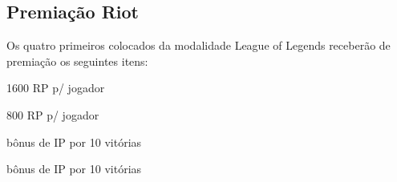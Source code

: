\subsection{Premiação Riot}

Os quatro primeiros colocados da modalidade League of Legends receberão de premiação os seguintes itens:

\begin{description}[leftmargin=!,labelwidth=\widthof{\bfseries 1º colocado},labelindent=1.5em]
	\item[1º colocado] 1600 RP p/ jogador
	\item[2º colocado] 800 RP p/ jogador
	\item[3º colocado] bônus de IP por 10 vitórias
	\item[4º colocado] bônus de IP por 10 vitórias
\end{description}
